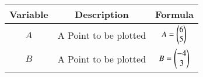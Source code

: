 \begin{center}
    \begin{tabular}{|c|c|c|} 
        \hline
            \textbf{Variable} & \textbf{Description} & \textbf{Formula} \\ 
        \hline
            $A$   & A Point to be plotted & $A = \begin{pmatrix}6 \\ 5\end{pmatrix}$ \\ 
        \hline
            $B$   &  A Point to be plotted &  $B = \begin{pmatrix}-4 \\ 3\end{pmatrix}$\\ 
        \hline
    \end{tabular}
\end{center}  
